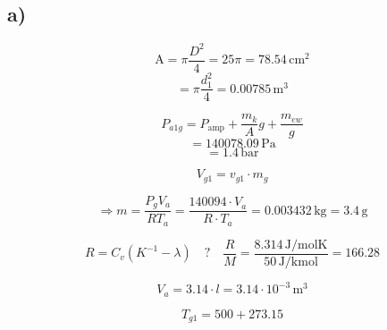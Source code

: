 

\subsection*{a)}

\[
\text{A} = \pi \frac{D^2}{4} = 25\pi = 78.54 \, \text{cm}^2
\]
\[
= \pi \frac{d_1^2}{4} = 0.00785 \, \text{m}^3
\]

\[
P_{a1g} = P_{\text{amp}} + \frac{m_k}{A} g + \frac{m_{ew}}{g}
\]
\[
= 140078.09 \, \text{Pa}
\]
\[
= 1.4 \, \text{bar}
\]

\[
V_{g1} = v_{g1} \cdot m_g
\]

\[
\Rightarrow m = \frac{P_g V_a}{R T_a} = \frac{140094 \cdot V_a}{R \cdot T_a} = 0.003432 \, \text{kg} = 3.4 \, \text{g}
\]

\[
R = C_v (K^{-1} - \lambda) \quad \text{?} \quad \frac{R}{M} = \frac{8.314 \, \text{J/molK}}{50 \, \text{J/kmol}} = 166.28
\]

\[
V_a = 3.14 \cdot l = 3.14 \cdot 10^{-3} \, \text{m}^3
\]

\[
T_{g1} = 500 + 273.15
\]